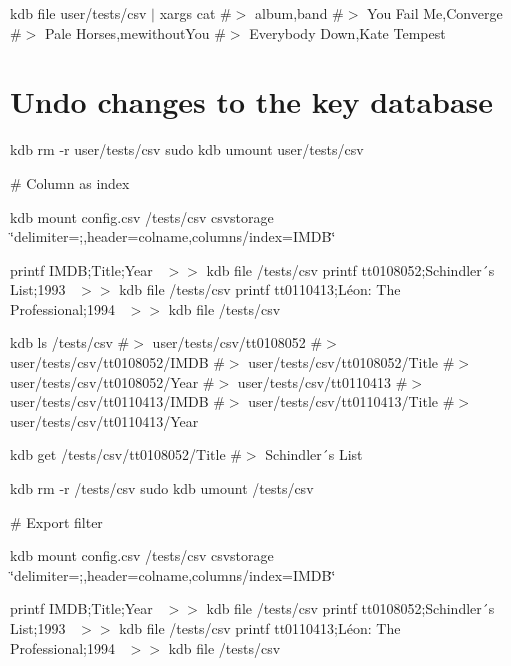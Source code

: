 kdb file user/tests/csv $\vert$ xargs cat \#$>$ album,band \#$>$ You Fail Me,Converge \#$>$ Pale Horses,mewithout\+You \#$>$ Everybody Down,Kate Tempest\hypertarget{autotoc_md124_autotoc_md139}{}\section{Undo changes to the key database}\label{autotoc_md124_autotoc_md139}
kdb rm -\/r user/tests/csv sudo kdb umount user/tests/csv 
\begin{DoxyCode}
# Column as index
\end{DoxyCode}
 kdb mount config.\+csv /tests/csv csvstorage \char`\"{}delimiter=;,header=colname,columns/index=\+I\+M\+D\+B\char`\"{}

printf \textquotesingle{}I\+M\+DB;Title;Year~\newline
\textquotesingle{} $>$$>$ {\ttfamily kdb file /tests/csv} printf \textquotesingle{}tt0108052;Schindler´s List;1993~\newline
\textquotesingle{} $>$$>$ {\ttfamily kdb file /tests/csv} printf \textquotesingle{}tt0110413;Léon\+: The Professional;1994~\newline
\textquotesingle{} $>$$>$ {\ttfamily kdb file /tests/csv}

kdb ls /tests/csv \#$>$ user/tests/csv/tt0108052 \#$>$ user/tests/csv/tt0108052/\+I\+M\+DB \#$>$ user/tests/csv/tt0108052/\+Title \#$>$ user/tests/csv/tt0108052/\+Year \#$>$ user/tests/csv/tt0110413 \#$>$ user/tests/csv/tt0110413/\+I\+M\+DB \#$>$ user/tests/csv/tt0110413/\+Title \#$>$ user/tests/csv/tt0110413/\+Year

kdb get /tests/csv/tt0108052/\+Title \#$>$ Schindler´s List

kdb rm -\/r /tests/csv sudo kdb umount /tests/csv


\begin{DoxyCode}
# Export filter
\end{DoxyCode}
 kdb mount config.\+csv /tests/csv csvstorage \char`\"{}delimiter=;,header=colname,columns/index=\+I\+M\+D\+B\char`\"{}

printf \textquotesingle{}I\+M\+DB;Title;Year~\newline
\textquotesingle{} $>$$>$ {\ttfamily kdb file /tests/csv} printf \textquotesingle{}tt0108052;Schindler´s List;1993~\newline
\textquotesingle{} $>$$>$ {\ttfamily kdb file /tests/csv} printf \textquotesingle{}tt0110413;Léon\+: The Professional;1994~\newline
\textquotesingle{} $>$$>$ {\ttfamily kdb file /tests/csv}


